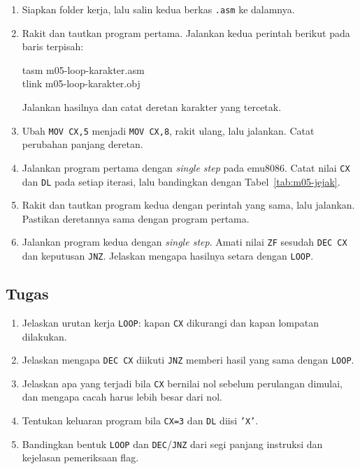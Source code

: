 \begin{enumerate}
    \item Siapkan folder kerja, lalu salin kedua berkas \texttt{.asm}
          ke dalamnya.
    \item Rakit dan tautkan program pertama. Jalankan kedua perintah
          berikut pada baris terpisah:
          \begin{perintah}
tasm m05-loop-karakter.asm\\
tlink m05-loop-karakter.obj
\end{perintah}
          Jalankan hasilnya dan catat deretan karakter yang tercetak.
    \item Ubah \texttt{MOV CX,5} menjadi \texttt{MOV CX,8}, rakit
          ulang, lalu jalankan. Catat perubahan panjang deretan.
    \item Jalankan program pertama dengan \emph{single step} pada
          emu8086. Catat nilai \texttt{CX} dan \texttt{DL} pada
          setiap iterasi, lalu bandingkan dengan
          Tabel~\ref{tab:m05-jejak}.
    \item Rakit dan tautkan program kedua dengan perintah yang sama,
          lalu jalankan. Pastikan deretannya sama dengan program
          pertama.
    \item Jalankan program kedua dengan \emph{single step}. Amati
          nilai \texttt{ZF} sesudah \texttt{DEC CX} dan keputusan
          \texttt{JNZ}. Jelaskan mengapa hasilnya setara dengan
          \texttt{LOOP}.
\end{enumerate}

\subsection{Tugas}

\begin{enumerate}
    \item Jelaskan urutan kerja \texttt{LOOP}: kapan \texttt{CX}
          dikurangi dan kapan lompatan dilakukan.
    \item Jelaskan mengapa \texttt{DEC CX} diikuti \texttt{JNZ} memberi
          hasil yang sama dengan \texttt{LOOP}.
    \item Jelaskan apa yang terjadi bila \texttt{CX} bernilai nol
          sebelum perulangan dimulai, dan mengapa cacah harus lebih
          besar dari nol.
    \item Tentukan keluaran program bila \texttt{CX=3} dan
          \texttt{DL} diisi \texttt{'X'}.
    \item Bandingkan bentuk \texttt{LOOP} dan \texttt{DEC}/\texttt{JNZ}
          dari segi panjang instruksi dan kejelasan pemeriksaan flag.
\end{enumerate}

